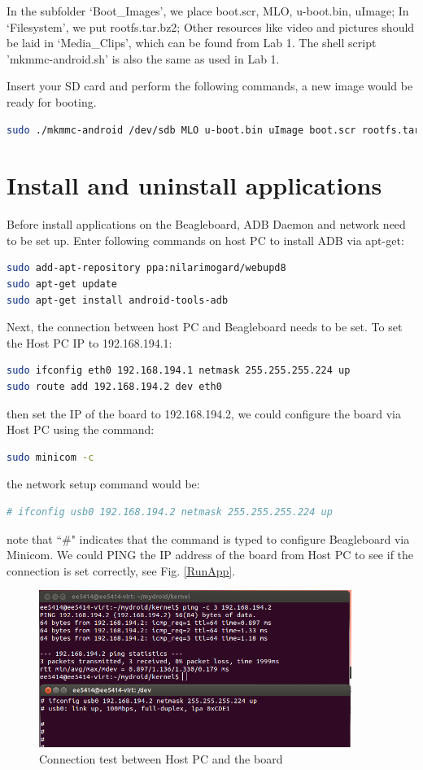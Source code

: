 \documentclass[12pt,journal,draftclsnofoot,onecolumn]{IEEEtran}
\begin{document}
In the subfolder `Boot\_Images', we place boot.scr, MLO, u-boot.bin, uImage; In `Filesystem', we put  rootfs.tar.bz2; Other resources like video and pictures should be laid in `Media\_Clips', which can be found from Lab 1. The shell script 'mkmmc-android.sh' is also the same as used in Lab 1.

Insert your SD card and perform the following commands, a new image would be ready for booting. 
 \begin{lstlisting}[language={bash}]
sudo ./mkmmc-android /dev/sdb MLO u-boot.bin uImage boot.scr rootfs.tar.bz2
\end{lstlisting}

\section{Install and uninstall applications}\label{HdDes}
Before install applications on the Beagleboard, ADB Daemon and network need to be set up.
Enter following commands on host PC to install ADB via apt-get:
\begin{lstlisting}[language={bash}]
sudo add-apt-repository ppa:nilarimogard/webupd8
sudo apt-get update
sudo apt-get install android-tools-adb
\end{lstlisting}
Next, the connection between host PC and Beagleboard needs to be set. To set the Host PC IP to 192.168.194.1:
\begin{lstlisting}[language={bash}]
sudo ifconfig eth0 192.168.194.1 netmask 255.255.255.224 up
sudo route add 192.168.194.2 dev eth0
\end{lstlisting}
then set the IP of the board to 192.168.194.2, we could configure the board via Host PC using the command:
\begin{lstlisting}[language={bash}]
sudo minicom -c
\end{lstlisting}
the network setup command would be:
\begin{lstlisting}[language={bash}]
# ifconfig usb0 192.168.194.2 netmask 255.255.255.224 up
\end{lstlisting}
note that ``\#" indicates that the command is typed to configure Beagleboard via Minicom. We could PING the IP address of the board from Host PC to see if the connection is set correctly, see Fig. \ref{RunApp}.
\begin{figure}[ht]
    \centering
    \includegraphics[width=4in]{./figs/lab1.png}
    \caption{Connection test between Host PC and the board}
    \label{lab1}
\end{figure}
\end{document}
